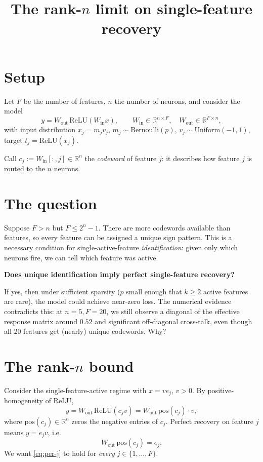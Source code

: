 \documentclass[11pt]{article}
\title{The rank-$n$ limit on single-feature recovery}
\author{}
\date{}
\begin{document}
\maketitle

\section{Setup}

Let $F$ be the number of features, $n$ the number of neurons, and consider the model
\begin{equation*}
y = W_{\mathrm{out}} \, \mathrm{ReLU}(W_{\mathrm{in}} x), \qquad
W_{\mathrm{in}} \in \mathbb{R}^{n \times F}, \quad W_{\mathrm{out}} \in \mathbb{R}^{F \times n},
\end{equation*}
with input distribution $x_j = m_j v_j$, $m_j \sim \mathrm{Bernoulli}(p)$, $v_j \sim \mathrm{Uniform}(-1, 1)$, target $t_j = \mathrm{ReLU}(x_j)$.

Call $c_j := W_{\mathrm{in}}[:, j] \in \mathbb{R}^n$ the \emph{codeword} of feature $j$: it describes how feature $j$ is routed to the $n$ neurons.

\section{The question}

Suppose $F > n$ but $F \leq 2^n - 1$. There are more codewords available than features, so every feature can be assigned a unique sign pattern. This is a necessary condition for single-active-feature \emph{identification}: given only which neurons fire, we can tell which feature was active.

\textbf{Does unique identification imply perfect single-feature recovery?}

If yes, then under sufficient sparsity ($p$ small enough that $k \geq 2$ active features are rare), the model could achieve near-zero loss. The numerical evidence contradicts this: at $n = 5, F = 20$, we still observe a diagonal of the effective response matrix around $0.52$ and significant off-diagonal cross-talk, even though all 20 features get (nearly) unique codewords. Why?

\section{The rank-$n$ bound}

Consider the single-feature-active regime with $x = v e_j$, $v > 0$. By positive-homogeneity of ReLU,
\begin{equation*}
y = W_{\mathrm{out}} \, \mathrm{ReLU}(c_j v) = W_{\mathrm{out}} \, \mathrm{pos}(c_j) \cdot v,
\end{equation*}
where $\mathrm{pos}(c_j) \in \mathbb{R}^n$ zeros the negative entries of $c_j$. Perfect recovery on feature $j$ means $y = e_j v$, i.e.
\begin{equation}
W_{\mathrm{out}} \, \mathrm{pos}(c_j) = e_j. \label{eq:per-j}
\end{equation}
We want \eqref{eq:per-j} to hold for \emph{every} $j \in \{1, \ldots, F\}$.
\end{document}
